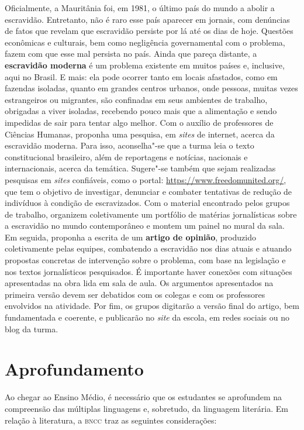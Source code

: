 \documentclass[12pt]{extarticle}
\begin{document}
Oficialmente, a Mauritânia foi, em 1981, o último país do
mundo a abolir a escravidão. Entretanto, não é raro esse país aparecer
em jornais, com denúncias de fatos que revelam que escravidão persiste
por lá até os dias de hoje. Questões econômicas e culturais, bem como
negligência governamental com o problema, fazem com que esse mal
persista no país. Ainda que pareça distante, a \textbf{escravidão
moderna} é um problema existente em muitos países e, inclusive, aqui no
Brasil. E mais: ela pode ocorrer tanto em locais afastados, como em
fazendas isoladas, quanto em grandes centros urbanos, onde pessoas,
muitas vezes estrangeiros ou migrantes, são confinadas em seus ambientes
de trabalho, obrigadas a viver isoladas, recebendo pouco mais que a
alimentação e sendo impedidas de sair para tentar algo melhor. Com o
auxílio de professores de Ciências Humanas, proponha uma pesquisa, em
\emph{sites} de internet, acerca da escravidão moderna. Para isso,
aconselha"-se que a turma leia o texto constitucional brasileiro, além de
reportagens e notícias, nacionais e internacionais, acerca da temática.
Sugere"-se também que sejam realizadas pesquisas em \emph{sites}
confiáveis, como o portal: \url{https://www.freedomunited.org/}, que tem
o objetivo de investigar, denunciar e combater tentativas de redução de
indivíduos à condição de escravizados. Com o material encontrado pelos
grupos de trabalho, organizem coletivamente um portfólio de matérias
jornalísticas sobre a escravidão no mundo contemporâneo e montem um
painel no mural da sala. Em seguida, proponha a escrita de um
\textbf{artigo de opinião}, produzido coletivamente pelas equipes,
combatendo a escravidão nos dias atuais e atuando propostas concretas de
intervenção sobre o problema, com base na legislação e nos textos
jornalísticos pesquisados. É importante haver conexões com situações
apresentadas na obra lida em sala de aula. Os argumentos apresentados na
primeira versão devem ser debatidos com os colegas e com os professores
envolvidos na atividade. Por fim, os grupos digitarão a versão final do
artigo, bem fundamentada e coerente, e publicarão no \emph{site} da
escola, em redes sociais ou no blog da turma.

\section{Aprofundamento}

Ao chegar ao Ensino Médio, é necessário que os estudantes se aprofundem
na compreensão das múltiplas linguagens e, sobretudo, da linguagem
literária. Em relação à literatura, a \textsc{bncc} traz as seguintes
considerações:
\end{document}
